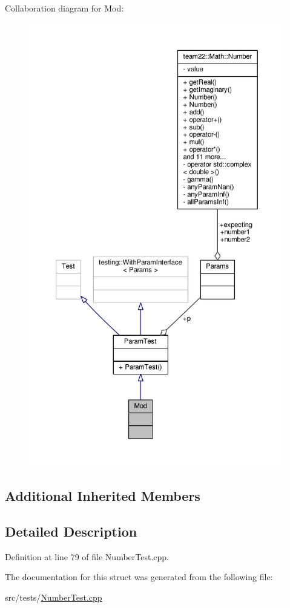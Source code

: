 Collaboration diagram for Mod\+:
\nopagebreak
\begin{figure}[H]
\begin{center}
\leavevmode
\includegraphics[height=550pt]{struct_mod__coll__graph}
\end{center}
\end{figure}
\subsection*{Additional Inherited Members}


\subsection{Detailed Description}


Definition at line 79 of file Number\+Test.\+cpp.



The documentation for this struct was generated from the following file\+:\begin{DoxyCompactItemize}
\item 
src/tests/\hyperlink{_number_test_8cpp}{Number\+Test.\+cpp}\end{DoxyCompactItemize}
